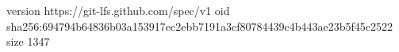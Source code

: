 version https://git-lfs.github.com/spec/v1
oid sha256:694794b64836b03a153917ec2ebb7191a3cf80784439c4b443ae23b5f45c2522
size 1347
